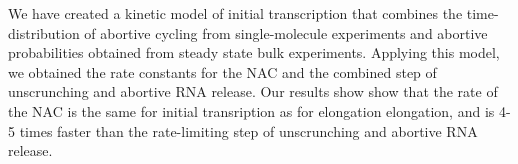 We have created a kinetic model of initial transcription that combines the
time-distribution of abortive cycling from single-molecule experiments and
abortive probabilities obtained from steady state bulk experiments. Applying
this model, we obtained the rate constants for the NAC and the combined step
of unscrunching and abortive RNA release. Our results show show that the rate
of the NAC is the same for initial transription as for elongation elongation,
and is 4-5 times faster than the rate-limiting step of unscrunching and
abortive RNA release.





